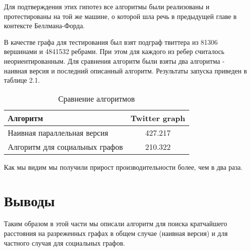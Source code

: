 Для подтверждения этих гипотез все алгоритмы были реализованы и протестированы на той же машине, о которой шла речь в предыдущей главе в контексте Беллмана-Форда.

В качестве графа для тестирования был взят подграф твиттера из 81306 вершинами и 4841532 ребрами. При этом для каждого из ребер считалось неориентированным. Для сравнения алгоритм были взяты два алгоритма - наивная версия и последний описанный алгоритм. Результаты запуска приведен в таблице 2.1.   
\FloatBarrier
\begin{table}
\centering

\begin{tabular}{l|c}  
Алгоритм & Twitter graph\\
\hline\hline
Наивная параллельная версия & 427.217 \\  
Алгоритм для социальных графов & 210.322  \\
\hline
\end{tabular}

\caption{Сравнение алгоритмов}
\label{graph_description}
\end{table}
\FloatBarrier

Как мы видим мы получили прирост производительности более, чем в два раза.

\FloatBarrier
\section{Выводы}
Таким образом в этой части мы описали алгоритм для поиска кратчайшего расстояния на разреженных графах в общем случае (наивная версия) и для частного случая для социальных графов. 
\FloatBarrier
